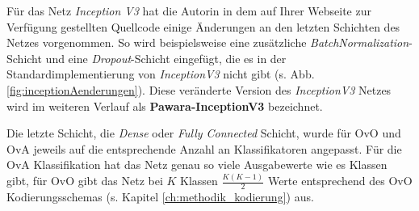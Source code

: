 Für das Netz \textit{Inception V3} hat die Autorin in dem auf Ihrer Webseite zur Verfügung gestellten Quellcode \cite{pawaraWebsiteCode} einige Änderungen an den letzten Schichten des Netzes vorgenommen. So wird beispielsweise eine zusätzliche \textit{BatchNormalization}-Schicht und eine \textit{Dropout}-Schicht eingefügt, die es in der Standardimplementierung von \textit{InceptionV3} nicht gibt (s. Abb. \ref{fig:inceptionAenderungen}). Diese veränderte Version des \textit{InceptionV3} Netzes wird im weiteren Verlauf als \textbf{Pawara-InceptionV3} bezeichnet.

Die letzte Schicht, die \textit{Dense} oder \textit{Fully Connected} Schicht, wurde für OvO und OvA jeweils auf die entsprechende Anzahl an Klassifikatoren angepasst. Für die OvA Klassifikation hat das Netz genau so viele Ausgabewerte wie es Klassen gibt, für OvO gibt das Netz bei $K$ Klassen $\frac{K(K-1)}{2}$ Werte entsprechend des OvO Kodierungsschemas (s. Kapitel \ref{ch:methodik_kodierung}) aus.

